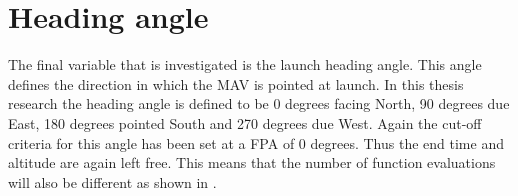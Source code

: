 %
%

\section{Heading angle}
\label{sec:headingAngle}
The final variable that is investigated is the launch heading angle. This angle defines the direction in which the \ac{MAV} is pointed at launch. In this thesis research the heading angle is defined to be 0 degrees facing North, 90 degrees due East, 180 degrees pointed South and 270 degrees due West. Again the cut-off criteria for this angle has been set at a \ac{FPA} of 0 degrees. Thus the end time and altitude are again left free. This means that the number of function evaluations will also be different as shown in .


%





